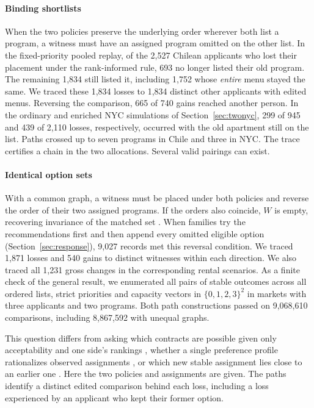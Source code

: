 \paragraph{Binding shortlists}
When the two policies preserve the underlying order wherever both list a program, a witness must have an assigned program omitted on the other list. In the fixed-priority pooled replay, of the 2,527 Chilean applicants who lost their placement under the rank-informed rule, 693 no longer listed their old program. The remaining 1,834 still listed it, including 1,752 whose \emph{entire} menu stayed the same. We traced these 1,834 losses to 1,834 distinct other applicants with edited menus. Reversing the comparison, 665 of 740 gains reached another person. In the ordinary and enriched NYC simulations of Section~\ref{sec:twonyc}, 299 of 945 and 439 of 2,110 losses, respectively, occurred with the old apartment still on the list. Paths crossed up to seven programs in Chile and three in NYC. The trace certifies a chain in the two allocations. Several valid pairings can exist.

\paragraph{Identical option sets}
With a common graph, a witness must be placed under both policies and reverse the order of their two assigned programs. If the orders also coincide, $W$ is empty, recovering invariance of the matched set \citep{roth1986}. When families try the recommendations first and then append every omitted eligible option (Section~\ref{sec:response}), 9,027 records met this reversal condition. We traced 1,871 losses and 540 gains to distinct witnesses within each direction. We also traced all 1,231 gross changes in the corresponding rental scenarios. As a finite check of the general result, we enumerated all pairs of stable outcomes across all ordered lists, strict priorities and capacity vectors in $\{0,1,2,3\}^2$ in markets with three applicants and two programs. Both path constructions passed on 9,068,610 comparisons, including 8,867,592 with unequal graphs.

This question differs from asking which contracts are possible given only acceptability and one side's rankings \citep{oneSide}, whether a single preference profile rationalizes observed assignments \citep{revealedStability}, or which new stable assignment lies close to an earlier one \citep{evolving}. Here the two policies and assignments are given. The paths identify a distinct edited comparison behind each loss, including a loss experienced by an applicant who kept their former option.
